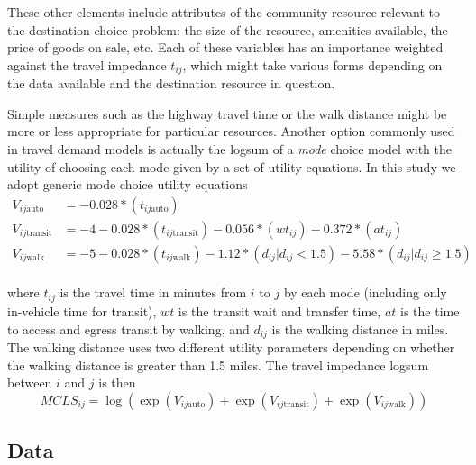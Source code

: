 \documentclass[3p, authoryear, review]{elsarticle} %
\begin{document}
These other elements include attributes of the community resource relevant to
the destination choice problem: the size of the resource, amenities available,
the price of goods on sale, etc. Each of these variables has an
importance weighted against the travel impedance \(t_{ij}\), which might take
various forms depending on the data available and the destination resource in
question.

Simple measures such as the highway travel time or the walk distance
might be more or less appropriate for particular resources. Another option
commonly used in travel demand models is actually the logsum of a \emph{mode}
choice model with the utility of choosing each mode given by a set of utility
equations. In this study we adopt generic mode choice utility equations
\begin{align*}
  V_{ij\mathrm{auto}} &= -0.028* (t_{ij\mathrm{auto}})\\
  V_{ij\mathrm{transit}} &= -4 -0.028* (t_{ij\mathrm{transit}}) 
    -0.056* (wt_{ij}) -0.372*(at_{ij})\\
  V_{ij\mathrm{walk}} &= -5 -0.028* (t_{ij\mathrm{walk}}) 
    -1.12* (d_{ij} | d_{ij} < 1.5)  
    -5.58* (d_{ij} | d_{ij} \geq 1.5) 
\end{align*}\\
where \(t_{ij}\) is the travel time in minutes from \(i\) to \(j\) by each mode
(including only in-vehicle time for transit), \(wt\) is the transit wait and
transfer time, \(at\) is the time to access and egress transit by walking, and \(d_{ij}\)
is the walking distance in miles. The walking distance uses two different
utility parameters depending on whether the walking distance is greater than 1.5
miles. The travel impedance logsum between \(i\) and \(j\) is then
\begin{equation}
MCLS_{ij} = \log\left(\exp(V_{ij\mathrm{auto}}) + \exp(V_{ij\mathrm{transit}}) + \exp(V_{ij\mathrm{walk}}) \right)
  \label{eq:mcls}
\end{equation}

\hypertarget{data}{%
\subsection{Data}\label{data}}
\end{document}
